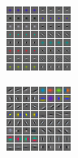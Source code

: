 \documentclass{article} %
\begin{document}
\begin{figure}[ht]
\begin{subfigure}[b]{\figsize}
        \caption{}
        \label{fig:L1filters}
  \end{subfigure}
  \hspace{\figspace} 
  \begin{subfigure}[b]{\figsize}
  		\includegraphics[width=\textwidth]{./Rebbutal_Figures/filters_group_sparse.png}
        \caption{}
        \label{fig:groupL1filters}
  \end{subfigure}
   \hspace{\figspace} 
  \begin{subfigure}[b]{\figsize}
        \includegraphics[width=\textwidth]{./Figures/filters_slow.png}

\end{subfigure}
\end{figure}
\end{document}
